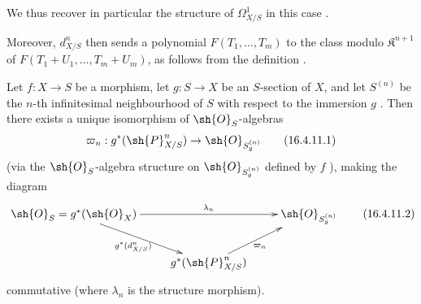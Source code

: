 We thus recover in particular the structure of $\Omega_{X/S}^1$ in this case .

Moreover, $d_{X/S}^n$ then sends a polynomial $F(T_1, \dots, T_m)$ to the class modulo $\mathfrak{K}^{n+1}$ of $F(T_1 + U_1, \dots, T_m + U_m)$, as follows from the definition .

\begin{proposition}[16.4.11]
\label{IV.16.4.11}  
Let $f:X \to S$ be a morphism, let $g: S \to X$ be an $S$-section of $X$, and let $S^{(n)}$ be the $n$-th infinitesimal neighbourhood of $S$ with respect to the immersion $g$ .
Then there exists a unique isomorphism of $\sh{O}_S$-algebras
\[
  \label{IV.16.4.11.1}
  \varpi_n: g^*(\sh{P}_{X/S}^n) \to \sh{O}_{S_g^{(n)}}
  \tag{16.4.11.1}
\]  
(via the $\sh{O}_S$-algebra structure on $\sh{O}_{S_g^{(n)}}$ defined by $f$ ), making the diagram
\[
  \label{IV.16.4.11.2}
  \xymatrix{
    \sh{O}_S = g^*(\sh{O}_X) \ar[rr]^-{\lambda_n} \ar[dr]_-{g^*(d_{X/S}^n)} && \sh{O}_{S_g^{(n)}} \\
    & g^*(\sh{P}_{X/S}^n) \ar[ur]_-{\varpi_n}
  }
  \tag{16.4.11.2}
\]
commutative (where $\lambda_n$ is the structure morphism).
\end{proposition} 

